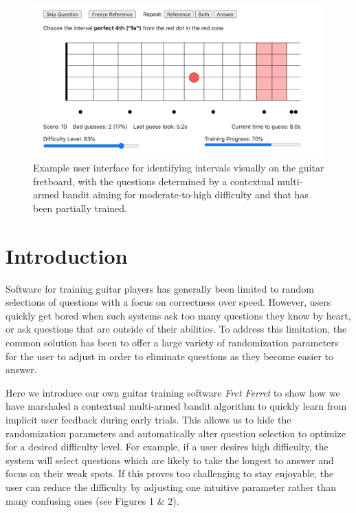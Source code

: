 \documentclass[manuscript, nonacm]{acmart_no_footer}
\begin{document}
\begin{figure}[h]
  \includegraphics[width=\linewidth]{canonical_image_fret_ferret copy.png}
  \caption{Example user interface for identifying intervals visually on the guitar fretboard, with the questions determined by a contextual multi-armed bandit aiming for moderate-to-high difficulty and that has been partially trained.}
  \label{fig:teaser}
\end{figure}

\section{Introduction}

Software for training guitar players has generally been limited to random selections of questions with a focus on correctness over speed\cite{guitar_trainer1, guitar_trainer2, guitar_trainer3}.  However, users quickly get bored when such systems ask too many questions they know by heart, or ask questions that are outside of their abilities. To address this limitation, the common solution has been to offer a large variety of randomization parameters for the user to adjust in order to eliminate questions as they become easier to answer. 

Here we introduce our own guitar training software \textit{Fret Ferret} to show how we have marshaled a contextual multi-armed bandit algorithm\cite{multi_armed_bandits1, multi_armed_bandits2} to quickly learn from implicit user feedback during early trials. This allows us to hide the randomization parameters and automatically alter question selection to optimize for a desired difficulty level. For example, if a user desires high difficulty, the system will select questions which are likely to take the longest to answer and focus on their weak spots. If this proves too challenging to stay enjoyable, the user can reduce the difficulty by adjusting one intuitive parameter rather than many confusing ones (see Figures 1 \& 2).
\end{document}
